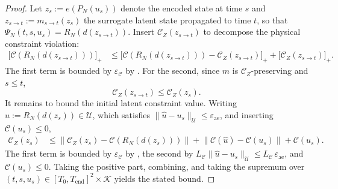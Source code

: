 \documentclass[10pt,a4paper]{amsart}
\begin{document}
\begin{proof}
Let $z_s := e(P_N(u_s))$ denote the encoded state at time $s$ and
$z_{s \to t} := m_{s\to t}(z_s)$ the surrogate latent state propagated to time $t$, so that
$\Psi_{N}(t,s,u_s) = R_N(d(z_{s \to t}))$. Insert
$\mathcal{C}_Z(z_{s \to t})$ to decompose the physical constraint violation:
\begin{align*}
\bigl[\mathcal{C}(R_N(d(z_{s \to t})))\bigr]_+
&\leq
\bigl[\mathcal{C}(R_N(d(z_{s \to t})))
- \mathcal{C}_Z(z_{s \to t})\bigr]_+
+ \bigl[\mathcal{C}_Z(z_{s \to t})\bigr]_+.
\end{align*}
The first term is bounded by $\varepsilon_{\mathcal{C}}$
by . For the second, since  $m$ is $\mathcal{C}_Z$-preserving and $s \leq t$,
\[
    \mathcal{C}_Z(z_{s \to t})  \leq \mathcal{C}_Z(z_s).
\]
It remains to bound the initial latent constraint
value. Writing
$\hat{u} := R_N(d(z_s)) \in \mathcal{U}$,
which satisfies
$\|\hat{u} - u_s\|_{\mathcal{U}} \leq
\varepsilon_{\mathrm{ae}}$, and inserting
$\mathcal{C}(u_s) \leq 0$,
\begin{align*}
\mathcal{C}_Z(z_s)
&\leq
\bigl\|\mathcal{C}_Z(z_s)
- \mathcal{C}(R_N(d(z_s)))\bigr\|
+ \bigl\|\mathcal{C}(\hat{u})
- \mathcal{C}(u_s)\bigr\|
+ \mathcal{C}(u_s).
\end{align*}
The first term is bounded by $\varepsilon_{\mathcal{C}}$
by , the second by
$L_{\mathcal{C}}\|\hat{u} - u_s\|_{\mathcal{U}}
\leq L_{\mathcal{C}}\,\varepsilon_{\mathrm{ae}}$,
and $\mathcal{C}(u_s) \leq 0$. Taking the positive part, combining, and taking the supremum over
$(t,s,u_s) \in [T_0,T_{\mathrm{end}}]^2 \times \mathcal K$ yields the stated bound.
\end{proof}
\end{document}
